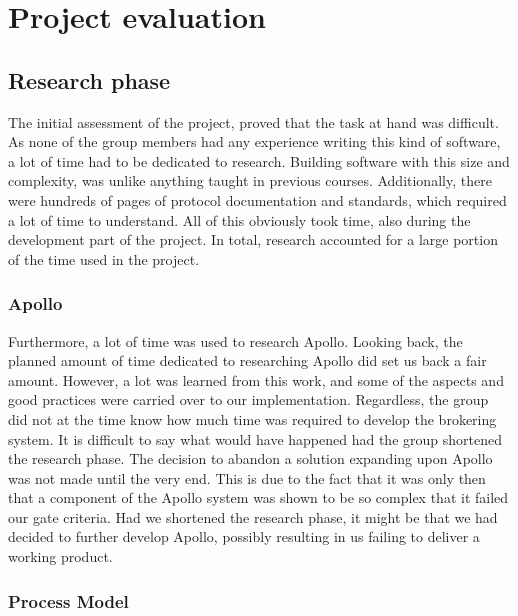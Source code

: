 
\chapter{Project evaluation}
\label{ch:project_evaluation}

\section{Research phase}
\label{sec:project_evaluation-research_phase}

The initial assessment of the project, proved that the task at hand was difficult. As none of the group members had any experience writing this kind of software, a lot of time had to be dedicated to research. Building software with this size and complexity, was unlike anything taught in previous courses. Additionally, there were hundreds of pages of protocol documentation and standards, which required a lot of time to understand. All of this obviously took time, also during the development part of the project. In total, research accounted for a large portion of the time used in the project.

\subsection{Apollo}
\label{subsec:project_evaluation-research_phase-apollo}

Furthermore, a lot of time was used to research Apollo. Looking back, the planned amount of time dedicated to researching Apollo did set us back a fair amount. However, a lot was learned from this work, and some of the aspects and good practices were carried over to our implementation. Regardless, the group did not at the time know how much time was required to develop the brokering system. It is difficult to say what would have happened had the group shortened the research phase. The decision to abandon a solution expanding upon Apollo was not made until the very end. This is due to the fact that it was only then that a component of the Apollo system was shown to be so complex that it failed our gate criteria. Had we shortened the research phase, it might be that we had decided to further develop Apollo, possibly resulting in us failing to deliver a working product.


\subsection{Process Model}
\label{subsec:project_evaluation-research_phase-process_model}

